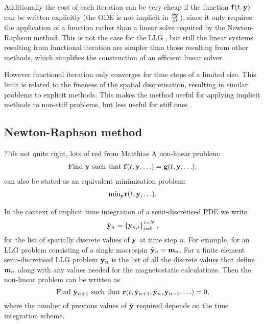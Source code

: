 Additionally the cost of each iteration can be very cheap if the function ${\mathbf{f}}(t, \mathbf{y})$ can be written explicitly (\ie the ODE is not implicit in $\frac{\partial \mathbf{y}}{\partial t}$), since it only requires the application of a function rather than a linear solve required by the Newton-Raphson method.
This is not the case for the LLG \cite{Bartels2006}, but still the linear systems resulting from functional iteration are simpler than those resulting from other methods, which simplifies the construction of an efficient linear solver.

However functional iteration only converges for time steps of a limited size.
This limit is related to the fineness of the spatial discretisation, resulting in similar problems to explicit methods.
This makes the method useful for applying implicit methods to non-stiff problems, but less useful for stiff ones \cite{Iserles2009}.


\subsection{Newton-Raphson method}
\label{sec:newt-raph}

??ds not quite right, lots of red from Matthias
A non-linear problem:
\begin{equation}
  \begin{aligned}
    \text{Find $\mathbf{y}$ such that } {\mathbf{f}}(t, \mathbf{y}, \ldots) = {\mathbf{g}}(t, \mathbf{y}, \ldots).
  \end{aligned} 
\end{equation}
can also be stated as an equivalent minimisation problem:
\begin{equation}
  \label{eq:non-lin-system}
  \begin{aligned}
    \text{min}_{\mathbf{y}} \mathbf{r}(t, \mathbf{y}, \ldots).
  \end{aligned}
\end{equation}

In the context of implicit time integration of a semi-discretised PDE we write
\begin{equation}
  \tilde{\mathbf{y}}_n = \left\{ {\mathbf{y}_{n,i}} \right\}_{i=0}^{i=N},
\end{equation}
for the list of spatially discrete values of $\mathbf{y}$ at time step $n$.
For example, for an LLG problem consisting of a single macrospin $\tilde{\mathbf{y}}_n = \mathbf{m}_n$.
For a finite element semi-discretised LLG problem $\tilde{\mathbf{y}}_n$ is the list of all the discrete values that define $\mathbf{m}_n$ along with any values needed for the magnetostatic calculations.
Then the non-linear problem can be written as 
\begin{equation}
  \text{Find $\tilde{\mathbf{y}}_{n+1}$ such that } \mathbf{r}(t, \tilde{\mathbf{y}}_{n+1}, \tilde{\mathbf{y}}_n, \tilde{\mathbf{y}}_{n-1}, \ldots) = 0,
\end{equation}
where the number of previous values of $\tilde{\mathbf{y}}$ required depends on the time integration scheme.

